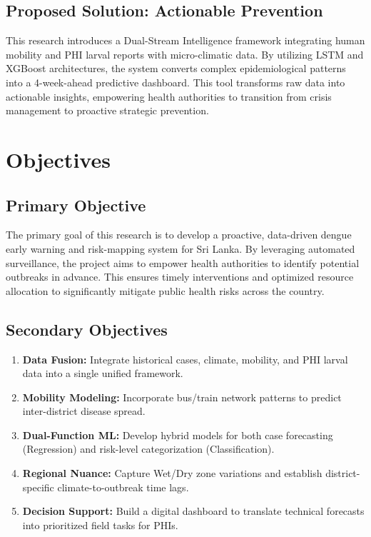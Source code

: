 ﻿\documentclass[12pt,a4paper]{article}
\begin{document}
\subsection{Proposed Solution: Actionable Prevention}
This research introduces a Dual-Stream Intelligence framework integrating human mobility and PHI larval reports with micro-climatic data. By utilizing LSTM and XGBoost architectures, the system converts complex epidemiological patterns into a 4-week-ahead predictive dashboard. This tool transforms raw data into actionable insights, empowering health authorities to transition from crisis management to proactive strategic prevention.

\section{Objectives}


\subsection{Primary Objective}
The primary goal of this research is to develop a proactive, data-driven dengue early warning and risk-mapping system for Sri Lanka.
By leveraging automated surveillance, the project aims to empower health authorities to identify potential outbreaks in advance. This ensures timely interventions and optimized resource allocation to significantly mitigate public health risks across the country.

\subsection{Secondary Objectives}
\begin{enumerate}
    \item \textbf{Data Fusion:} Integrate historical cases, climate, mobility, and PHI larval data into a single unified framework.
    \item \textbf{Mobility Modeling:} Incorporate bus/train network patterns to predict inter-district disease spread.
    \item \textbf{Dual-Function ML:} Develop hybrid models for both case forecasting (Regression) and risk-level categorization (Classification).
    \item \textbf{Regional Nuance:} Capture Wet/Dry zone variations and establish district-specific climate-to-outbreak time lags.
    \item \textbf{Decision Support:} Build a digital dashboard to translate technical forecasts into prioritized field tasks for PHIs.

\end{enumerate}
\end{document}
